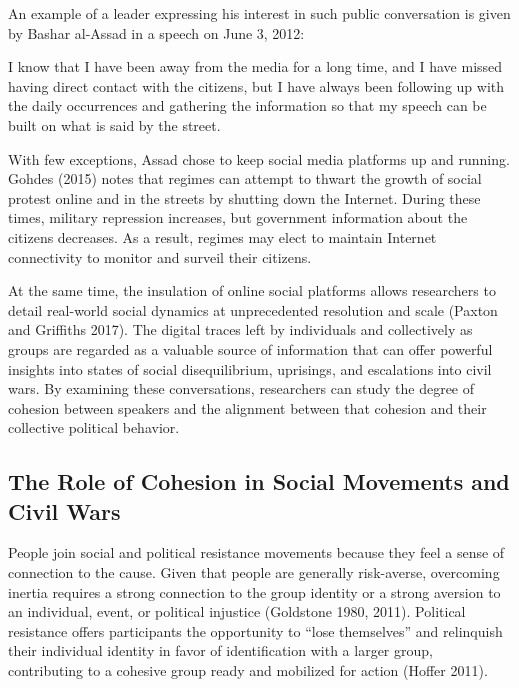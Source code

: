 \documentclass[english,man]{apa6}
\begin{document}
An example of a leader expressing his interest in such public
conversation is given by Bashar al-Assad in a speech on June 3, 2012:

\begin{singlespace}
\setlength{\leftskip}{1cm}

\noindent I know that I have been away from the media for a long time, and I
have missed having direct contact with the citizens, but I have always been
following up with the daily occurrences and gathering the information so that my
speech can be built on what is said by the street.

\setlength{\leftskip}{0pt}
\end{singlespace}

\noindent With few exceptions, Assad chose to keep social media platforms up and
running. Gohdes (2015) notes that regimes can attempt to thwart
the growth of social protest online and in the streets by shutting down the
Internet. During these times, military repression increases, but government
information about the citizens decreases. As a result, regimes may elect to
maintain Internet connectivity to monitor and surveil their citizens.

At the same time, the insulation of online social platforms allows researchers
to detail real-world social dynamics at unprecedented resolution and scale
(Paxton and Griffiths 2017). The digital traces left by individuals and collectively as
groups are regarded as a valuable source of information that can offer powerful
insights into states of social disequilibrium, uprisings, and escalations into
civil wars. By examining these conversations, researchers can study the degree
of cohesion between speakers and the alignment between that cohesion and their
collective political behavior.

\hypertarget{the-role-of-cohesion-in-social-movements-and-civil-wars}{%
\subsection{The Role of Cohesion in Social Movements and Civil Wars}\label{the-role-of-cohesion-in-social-movements-and-civil-wars}}

People join social and political resistance movements because they feel a sense
of connection to the cause. Given that people are generally risk-averse,
overcoming inertia requires a strong connection to the group identity or a
strong aversion to an individual, event, or political injustice
(Goldstone 1980, 2011). Political resistance offers participants the
opportunity to \enquote{lose themselves} and relinquish their individual identity in
favor of identification with a larger group, contributing to a cohesive group
ready and mobilized for action (Hoffer 2011).
\end{document}
